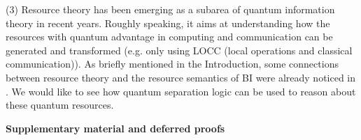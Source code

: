 \documentclass[conference,compsoc, 10pt]{IEEEtran}
\newcommand{\jh}[1]{\textit{\color{red}[JH] : #1}}
\newcommand{\sd}{\diamond}%
\begin{document}
	(3) Resource theory has been emerging as a subarea of quantum information theory in recent years. 
	Roughly speaking, it aims at understanding  how the resources  with  quantum advantage in computing and communication can be generated and transformed (e.g. only using LOCC (local operations and classical communication))\cite{HO13, Plenio2014, VMG14}.
  As briefly mentioned in the Introduction, some  connections between resource theory and the resource semantics of BI were  already noticed in   \cite{Doc19,CoeckeFS16,fritz_2017}.
	We would like to see how quantum separation logic can be used to reason about these quantum resources.
	
	
	
	
	
	
	
	\onecolumn
	
	{\centering\Large \textbf{Supplementary material and deferred proofs}}
	
\end{document}
